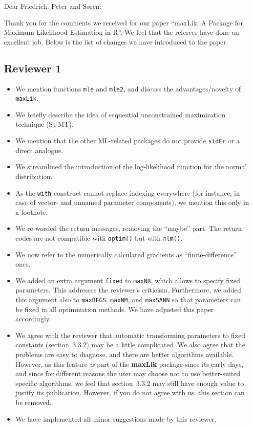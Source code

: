 \documentclass[12pt,parskip=half]{scrartcl}
\begin{document}
Dear Friedrich, Peter and Søren:

\bigskip

Thank you for the comments we received for our paper ``maxLik: A
Package for Maximum Likelihood Estimation in R''.  We feel that the
referees have done an excellent job.  Below is the list of changes we
have introduced to the paper.

\subsection*{Reviewer 1}

\begin{itemize}
\item We mention functions \texttt{mle} and \texttt{mle2}, and discuss
  the advantages/novelty of \texttt{maxLik}.
\item We briefly describe the idea of sequential unconstrained
  maximization technique (SUMT).
\item We mention that the other ML-related packages do not provide
  \texttt{stdEr} or a direct analogue.
\item We streamlined the introduction of the log-likelihood function
   for the normal distribution.
\item As the \texttt{with}-construct cannot replace indexing
  everywhere (for instance, in case of vector- and unnamed
  parameter components), we mention this only in a footnote.
\item We re-worded the return messages, removing the ``maybe'' part.
  The return codes are not compatible with \texttt{optim()}
  but with \texttt{nlm()}.
\item We now refer to the numerically calculated gradients as
  ``finite-difference'' ones.
\item We added an extra argument \texttt{fixed} to
  \texttt{maxNR}, which allows to specify fixed parameters.  This
  addresses the reviewer's criticism.
  Furthermore, we added this argument also to \texttt{maxBFGS},
  \texttt{maxNM}, and \texttt{maxSANN}
  so that parameters can be fixed in all optimization methods.
  We have adjusted this paper accordingly.
\item We agree with the reviewer that automatic transforming parameters
  to fixed constants (section~3.3.2) may be a little complicated.  We
  also agree that the problems are easy to diagnose, and there are
  better algorithms available.  However, as this feature \emph{is}
  part of the \textbf{maxLik} package since its early days, and since for different
  reasons
  the user may choose not to use better-suited specific algorithms, we
  feel that section~3.3.2 may still have enough value to justify its
  publication.  However, if you do not agree with us, this section can be
  removed.
\item We have implemented all minor suggestions made by this reviewer.
\end{itemize}
\end{document}
